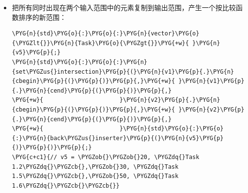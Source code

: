 \begin{itemize}
\begin{codeblockbg}
\begin{Verbatim}[commandchars=\\\{\},breaklines=true,breakanywhere=true,fontsize=\codefont,xleftmargin=17bp]
\PYG{n}{std}\PYG{o}{:}\PYG{o}{:}\PYG{n}{vector}\PYG{o}{\PYGZlt{}}\PYG{n}{Task}\PYG{o}{\PYGZgt{}}\PYG{+w}{ }\PYG{n}{v4}\PYG{p}{;}
\PYG{n}{std}\PYG{o}{:}\PYG{o}{:}\PYG{n}{merge}\PYG{p}{(}\PYG{n}{v1}\PYG{p}{.}\PYG{n}{cbegin}\PYG{p}{(}\PYG{p}{)}\PYG{p}{,}\PYG{+w}{ }\PYG{n}{v1}\PYG{p}{.}\PYG{n}{cend}\PYG{p}{(}\PYG{p}{)}\PYG{p}{,}
\PYG{+w}{           }\PYG{n}{v2}\PYG{p}{.}\PYG{n}{cbegin}\PYG{p}{(}\PYG{p}{)}\PYG{p}{,}\PYG{+w}{ }\PYG{n}{v2}\PYG{p}{.}\PYG{n}{cend}\PYG{p}{(}\PYG{p}{)}\PYG{p}{,}
\PYG{+w}{           }\PYG{n}{std}\PYG{o}{:}\PYG{o}{:}\PYG{n}{back\PYGZus{}inserter}\PYG{p}{(}\PYG{n}{v4}\PYG{p}{)}\PYG{p}{)}\PYG{p}{;}
\PYG{c+c1}{// v4 = \PYGZob{}\PYGZob{}10, \PYGZdq{}Task 1.1\PYGZdq{}\PYGZcb{},\PYGZob{}20, \PYGZdq{}Task 1.2\PYGZdq{}\PYGZcb{},\PYGZob{}20, \PYGZdq{}Task 1.3\PYGZdq{}\PYGZcb{},}
\PYG{c+c1}{//       \PYGZob{}20, \PYGZdq{}Task 1.4\PYGZdq{}\PYGZcb{},\PYGZob{}20, \PYGZdq{}Task 2.1\PYGZdq{}\PYGZcb{},\PYGZob{}30, \PYGZdq{}Task 1.5\PYGZdq{}\PYGZcb{},}
\PYG{c+c1}{//       \PYGZob{}30, \PYGZdq{}Task 2.2\PYGZdq{}\PYGZcb{},\PYGZob{}30, \PYGZdq{}Task 2.3\PYGZdq{}\PYGZcb{},\PYGZob{}30, \PYGZdq{}Task 2.4\PYGZdq{}\PYGZcb{},}
\PYG{c+c1}{//       \PYGZob{}40, \PYGZdq{}Task 2.5\PYGZdq{}\PYGZcb{},\PYGZob{}50, \PYGZdq{}Task 1.6\PYGZdq{}\PYGZcb{},\PYGZob{}50, \PYGZdq{}Task 2.6\PYGZdq{}\PYGZcb{}\PYGZcb{}}
\end{Verbatim}
\end{codeblockbg}



\item {}把所有同时出现在两个输入范围中的元素复制到输出范围，产生一个按比较函数排序的新范围：



\begin{codeblockbg}
\begin{Verbatim}[commandchars=\\\{\},breaklines=true,breakanywhere=true,fontsize=\codefont,xleftmargin=17bp]
\PYG{n}{std}\PYG{o}{:}\PYG{o}{:}\PYG{n}{vector}\PYG{o}{\PYGZlt{}}\PYG{n}{Task}\PYG{o}{\PYGZgt{}}\PYG{+w}{ }\PYG{n}{v5}\PYG{p}{;}
\PYG{n}{std}\PYG{o}{:}\PYG{o}{:}\PYG{n}{set\PYGZus{}intersection}\PYG{p}{(}\PYG{n}{v1}\PYG{p}{.}\PYG{n}{cbegin}\PYG{p}{(}\PYG{p}{)}\PYG{p}{,}\PYG{+w}{ }\PYG{n}{v1}\PYG{p}{.}\PYG{n}{cend}\PYG{p}{(}\PYG{p}{)}\PYG{p}{,}
\PYG{+w}{                      }\PYG{n}{v2}\PYG{p}{.}\PYG{n}{cbegin}\PYG{p}{(}\PYG{p}{)}\PYG{p}{,}\PYG{+w}{ }\PYG{n}{v2}\PYG{p}{.}\PYG{n}{cend}\PYG{p}{(}\PYG{p}{)}\PYG{p}{,}
\PYG{+w}{                      }\PYG{n}{std}\PYG{o}{:}\PYG{o}{:}\PYG{n}{back\PYGZus{}inserter}\PYG{p}{(}\PYG{n}{v5}\PYG{p}{)}\PYG{p}{)}\PYG{p}{;}
\PYG{c+c1}{// v5 = \PYGZob{}\PYGZob{}20, \PYGZdq{}Task 1.2\PYGZdq{}\PYGZcb{},\PYGZob{}30, \PYGZdq{}Task 1.5\PYGZdq{}\PYGZcb{},\PYGZob{}50, \PYGZdq{}Task 1.6\PYGZdq{}\PYGZcb{}\PYGZcb{}}
\end{Verbatim}
\end{codeblockbg}



\end{itemize}

